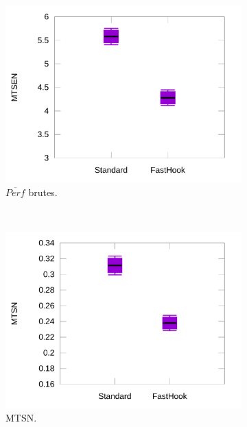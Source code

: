 \begin{figure}[htbp]
\begin{subfigure}[t]{0.49\textwidth}
			\includegraphics[width=\textwidth]{figures/ch5/brownRawProducts}
			\caption{$\overline{Perf}$ brutes.}
			\label{fig:brownRawProducts}
		\end{subfigure}
		~
		\begin{subfigure}[t]{0.49\textwidth}
			\centering
			\includegraphics[width=\textwidth]{figures/ch5/brownNormTimes}
			\caption{MTSN.}
			\label{fig:brownNormTimes}
		\end{subfigure}
				~
		\begin{subfigure}[t]{0.49\textwidth}
			\centering

\end{subfigure}
\end{figure}
